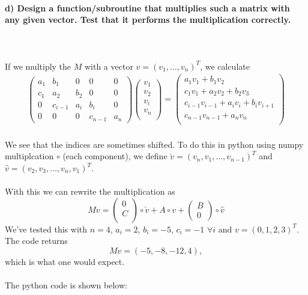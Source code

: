 \paragraph{
    d) Design a function/subroutine that multiplies such a matrix with
    any given vector. Test that it performs the multiplication correctly.
} \ \\
    \\
    If we multiply the $M$ with a vector $v = (v_1, \dots, v_n)^T$,
    we calculate \\
    \begin{align}
        \begin{pmatrix}
            a_1 & b_1 & 0      & 0       & 0 \\
            c_1 & a_2 & b_2    & 0       & 0 \\
            0   & c_{i-1} & a_i & b_i    &0    \\
            0   & 0   & 0      & c_{n-1} & a_n
        \end{pmatrix}
        \begin{pmatrix}
            v_1 \\ v_2 \\v_i \\ v_n\\
        \end{pmatrix}=\begin{pmatrix}
            a_1 v_1 + b_1 v_2 \\
            c_1 v_1 + a_2 v_2 + b_2 v_3 \\
            c_{i-1} v_{i-1} + a_i v_i + b_i v_{i+1} \\
            c_{n-1} v_{n-1} + a_n v_n\\
        \end{pmatrix}
    \end{align} \ \\
    We see that the indices are sometimes shifted. To do this in
    python using numpy multiplcation $\circ$ (each component), we
    define $\check{v} = (v_n, v_1, \dots, v_{n-1})^T$ and
    $\hat{v} = (v_2, v_3, \dots, v_n , v_1)^T$. \\
    \\
    With this we can rewrite the multiplication as
    \begin{equation}
    	Mv =
    	\begin{pmatrix} 0 \\ C \\	\end{pmatrix}
    	\circ \check{v} + A \circ v +
    	\begin{pmatrix} B \\ 0	\end{pmatrix} \circ \hat{v}
    \end{equation}
    We've tested this with $n=4$, $a_i = 2$, $b_i = -5$,
    $c_i = -1$ $ \forall i$ and $v = (0,1,2,3)^T$. The code returns
    \begin{equation}
    	Mv = (-5, -8, -12, 4),
    \end{equation}
    which is what one would expect. \\
    \\
    The python code is shown below:
    

